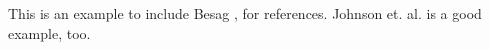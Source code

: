 \documentclass[a4, 12pt]{article}
\begin{document}
\nocite{besag74, lehman86, johnson87}

This is an example to include Besag \cite{besag74}, \cite{lehman86} for references. Johnson et. al. \cite{johnson87} is a good example, too.



\end{document}
